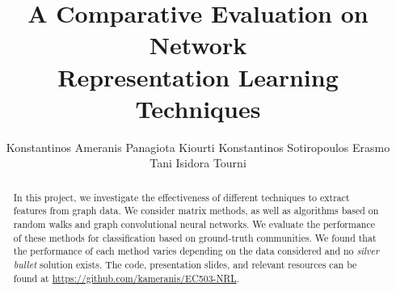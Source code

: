 \documentclass{article} %
\title{A Comparative Evaluation on Network \\Representation Learning Techniques}
\author{Konstantinos Ameranis \And Panagiota Kiourti \And Konstantinos Sotiropoulos \AND Erasmo Tani \And Isidora Tourni}
\begin{document}
\maketitle

\begin{abstract}
In this project, we investigate the effectiveness of different techniques to extract features from graph data.
We consider matrix methods, as well as algorithms based on random walks and graph convolutional neural networks. We evaluate the performance of these methods for classification based on ground-truth communities. We found that the performance of each method varies depending on the data considered and no \emph{silver bullet} solution exists. The code, presentation slides, and relevant resources can be found at \url{https://github.com/kameranis/EC503-NRL}.

\end{abstract}











\end{document}
